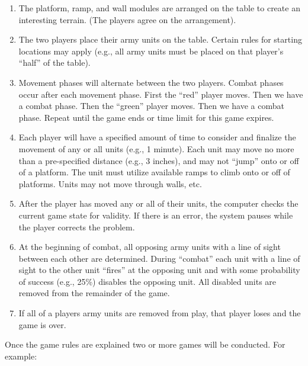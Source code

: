 \documentclass[10pt]{article}
\begin{document}
\begin{enumerate}

\item The platform, ramp, and wall modules are arranged on the table
  to create an interesting terrain.  (The players agree on the
  arrangement).

\item The two players place their army units on the table.  Certain
  rules for starting locations may apply (e.g., all army units must be
  placed on that player's ``half'' of the table).

\item Movement phases will alternate between the two players.  Combat
  phases occur after each movement phase.  First the ``red'' player
  moves.  Then we have a combat phase.  Then the ``green'' player
  moves.  Then we have a combat phase.  Repeat until the game ends or
  time limit for this game expires.

  \item Each player will have a specified amount of time to consider
    and finalize the movement of any or all units (e.g., 1 minute).
    Each unit may move no more than a pre-specified distance (e.g., 3
    inches), and may not ``jump'' onto or off of a platform.  The unit
    must utilize available ramps to climb onto or off of platforms.
    Units may not move through walls, etc.

  \item After the player has moved any or all of their units, the
    computer checks the current game state for validity.  If there is
    an error, the system pauses while the player corrects the
    problem.

  \item At the beginning of combat, all opposing army units with a
    line of sight between each other are determined.  During
    ``combat'' each unit with a line of sight to the other unit
    ``fires'' at the opposing unit and with some probability of
    success (e.g., 25\%) disables the opposing unit.  All disabled
    units are removed from the remainder of the game.

\item If all of a players army units are removed from play, that
  player loses and the game is over.

\end{enumerate}

\vspace{1.0in}


\noindent
Once the game rules are explained two or more games will be conducted.
For example:
\end{document}
